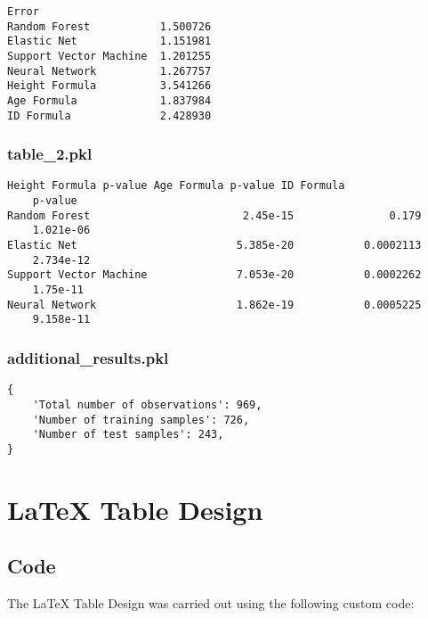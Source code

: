\documentclass[11pt]{article}
\begin{document}
\begin{Verbatim}[tabsize=4]
                           Error
Random Forest           1.500726
Elastic Net             1.151981
Support Vector Machine  1.201255
Neural Network          1.267757
Height Formula          3.541266
Age Formula             1.837984
ID Formula              2.428930
\end{Verbatim}

\subsubsection*{table\_2.pkl}

\begin{Verbatim}[tabsize=4]
                       Height Formula p-value Age Formula p-value ID Formula
	p-value
Random Forest                        2.45e-15               0.179
	1.021e-06
Elastic Net                         5.385e-20           0.0002113
	2.734e-12
Support Vector Machine              7.053e-20           0.0002262
	1.75e-11
Neural Network                      1.862e-19           0.0005225
	9.158e-11
\end{Verbatim}

\subsubsection*{additional\_results.pkl}

\begin{Verbatim}[tabsize=4]
{
    'Total number of observations': 969,
    'Number of training samples': 726,
    'Number of test samples': 243,
}
\end{Verbatim}

\section{LaTeX Table Design}
\subsection{{Code}}
The LaTeX Table Design was carried out using the following custom code:
\end{document}
